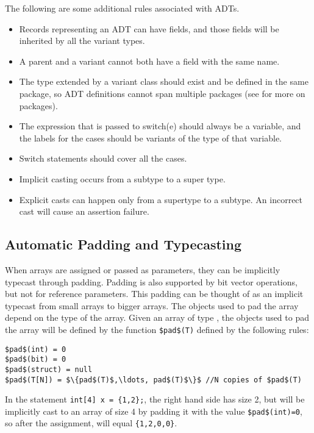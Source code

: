The following are some additional rules associated with ADTs. 
\begin{itemize}
\item Records representing an ADT can have fields, and those fields will be inherited by all the variant types.
\item A parent and a variant  cannot both have a field with the same name. 
\item The type extended by a variant class should exist and be defined in the same package, so ADT definitions cannot span multiple packages (see  for more on packages).
\item The expression that is passed to switch(e) should always be a variable, and the labels for the cases should be variants of the type of that variable.
\item Switch statements should cover all the cases.
\item Implicit casting occurs from a subtype to a super type.
\item Explicit casts can happen only from a supertype to a subtype. An incorrect cast will cause an assertion failure. 
\end{itemize}



\subsection{Automatic Padding and Typecasting}
When arrays are assigned or passed as parameters, they can be implicitly typecast through padding. Padding is also supported by bit vector operations, but not for reference parameters. This padding can be thought of as an implicit typecast from small arrays to bigger arrays. The objects used to pad the array depend on the type of the array. Given an array of type , the objects used to pad the array will be defined by the function \lstinline!$pad$(T)! defined by the following rules:
\begin{lstlisting}
$pad$(int) = 0 
$pad$(bit) = 0
$pad$(struct) = null
$pad$(T[N]) = $\{pad$(T)$,\ldots, pad$(T)$\}$ //N copies of $pad$(T)
\end{lstlisting}

\begin{Example}
In the statement \lstinline!int[4] x = {1,2};!, the right hand side has size 2, but will be implicitly cast to an array of size 4 by padding it with the value \lstinline!$pad$(int)=0!, so after the assignment,  will equal \lstinline!{1,2,0,0}!.
\end{Example}


